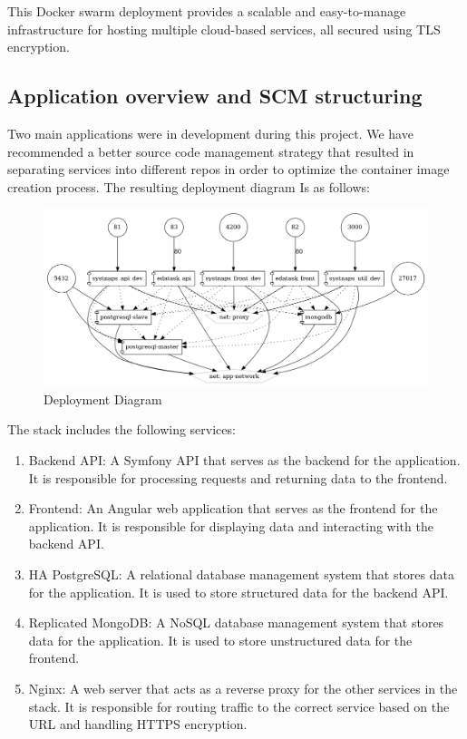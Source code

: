 \hspace{7mm}This Docker swarm deployment provides a scalable and easy-to-manage infrastructure for hosting multiple cloud-based services, all secured using TLS encryption.

\newpage

\subsection{Application overview and SCM structuring}

\hspace{7mm}Two main applications were in development during this project. We have recommended a better source code management strategy that resulted in separating services into different repos in order to optimize the container image creation process. The resulting deployment diagram Is as follows: 

 \begin{figure}[H]\centering
\includegraphics[width=1.0\textwidth,angle=00]{assets/f10.png}
\caption{ Deployment Diagram }
\label{fig:DeploymentDiagram}
\end{figure}

\hspace{7mm}The stack includes the following services: 
\begin{enumerate}
\item Backend API: A Symfony\cite{Symfony} API that serves as the backend for the application. It is responsible for processing requests and returning data to the frontend. 
\item Frontend: An Angular\cite{Angular} web application that serves as the frontend for the application. It is responsible for displaying data and interacting with the backend API. 
\item HA PostgreSQL\cite{PostgreSQL}: A relational database management system that stores data for the application. It is used to store structured data for the backend API. 
\item Replicated MongoDB\cite{MongoDB}: A NoSQL database management system that stores data for the application. It is used to store unstructured data for the frontend. 
\item Nginx\cite{Nginx}: A web server that acts as a reverse proxy for the other services in the stack. It is responsible for routing traffic to the correct service based on the URL and handling HTTPS encryption. 
\end{enumerate}

